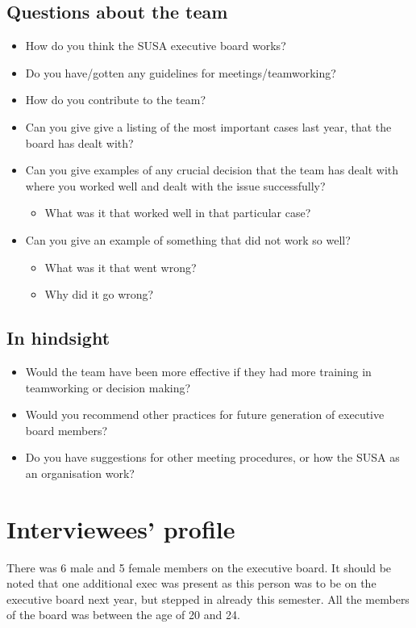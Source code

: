 \documentclass[a4paper,12pt,titlepage]{report}
\begin{document}
  \section*{Questions about the team}
  \begin{itemize}
  \item How do you think the SUSA executive board works?
  \item Do you have/gotten any guidelines for meetings/teamworking?
  \item How do you contribute to the team?
  \item Can you give give a listing of the most important cases last year, that
    the board has dealt with?
  \item Can you give examples of any crucial decision that the team
    has dealt with where you worked well and dealt with the issue successfully?
    \begin{itemize}
    \item What was it that worked well in that particular case?
    \end{itemize}
  \item Can you give an example of something that did not work so well?
    \begin{itemize}
    \item What was it that went wrong?
    \item Why did it go wrong?
    \end{itemize}
  \end{itemize}

  \section*{In hindsight}
  \begin{itemize}
  \item Would the team have been more effective if they had more training
    in teamworking or decision making?
  \item Would you recommend other practices for future
    generation of executive board members?
  \item Do you have suggestions for other meeting procedures,
    or how the SUSA as an organisation work?
  \end{itemize}
  
  \chapter{Interviewees' profile \label{susaprofile}}
  There was 6 male and 5 female members on the executive board. It should
  be noted that one additional exec was present as this person was to be on the
  executive board next year, but stepped in already this semester. All the members
  of the board was between the age of 20 and 24.
\end{document}
